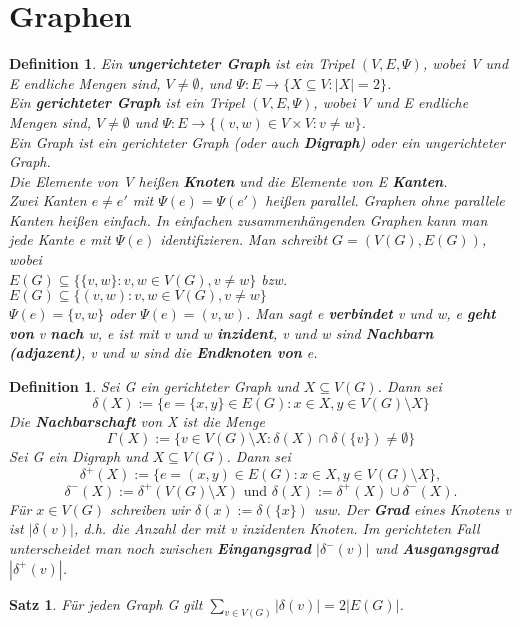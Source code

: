 \documentclass[12pt,a4paper]{article}
\theoremstyle{plain}
\newtheorem{Satz}[Theorem]{Satz}
\newtheorem{Definition}[Theorem]{Definition}
\newcommand{\herv}[1]{{\emph{\textbf{#1}}}}
\numberwithin{equation}{section}
\begin{document}
\section{Graphen}
\begin{Definition}
Ein \herv{ungerichteter Graph} ist ein Tripel $(V,E,\Psi)$, wobei V und E endliche Mengen sind, $V\neq\emptyset$, und $\Psi:E\rightarrow\{X\subseteq V:|X|=2\}$.\\
Ein \herv{gerichteter Graph} ist ein Tripel $(V,E,\Psi)$, wobei V und E endliche Mengen sind, $V\neq \emptyset$ und $\Psi: E\rightarrow\{(v,w)\in V\times V: v\neq w\}$.\\
Ein Graph ist ein gerichteter Graph (oder auch \herv{Digraph}) oder ein ungerichteter Graph. \\
Die Elemente von V heißen \herv{Knoten} und die Elemente von E \herv{Kanten}. \\
Zwei Kanten $e\neq e'$ mit $\Psi(e)=\Psi(e')$ heißen parallel. Graphen ohne parallele Kanten heißen einfach. In einfachen zusammenhängenden Graphen kann man jede Kante e mit $\Psi(e)$ identifizieren. Man schreibt $G=(V(G),E(G))$, wobei \\
$E(G)\subseteq\{\{v,w\}:v,w\in V(G), v\neq w\}$ bzw. $E(G)\subseteq\{(v,w):v,w\in V(G),v\neq w \}$\\
$\Psi(e)=\{v,w\}$ oder $\Psi(e)=(v,w)$. Man sagt e \herv{verbindet} v und w, e \herv{geht von} v \herv{nach} w, e ist mit v und w \herv{inzident}, v und w sind \herv{Nachbarn (adjazent)}, v und w sind die \herv{Endknoten von} e.
\end{Definition}
\begin{Definition}
Sei G ein gerichteter Graph und $X\subseteq V(G)$. Dann sei 
\[ \delta(X):=\{e=\{x,y\}\in E(G): x\in X, y \in V(G)\setminus X\} \]
Die \herv{Nachbarschaft} von X ist die Menge
\[ \Gamma(X):=\{v\in V(G)\setminus X: \delta(X) \cap \delta(\{v\})\neq \emptyset \} \]
Sei G ein Digraph und $X\subseteq V(G)$. Dann sei
\[ \delta^+(X):=\{e=(x,y)\in E(G): x\in X, y \in V(G)\setminus X\}, \]
\[ \delta^-(X):=\delta^+(V(G)\setminus X)\text{ und } \delta(X):=\delta^+(X)\cup \delta^-(X). \]
Für $x \in V(G)$ schreiben wir $\delta(x):=\delta(\{x\})$ usw. Der \herv{Grad} eines Knotens v ist $|\delta(v)|$, d.h. die Anzahl der mit v inzidenten Knoten. Im gerichteten Fall unterscheidet man noch zwischen \herv{Eingangsgrad} $|\delta^-(v)|$ und \herv{Ausgangsgrad} $|\delta^+(v)|$.
\end{Definition}
\begin{Satz}
Für jeden Graph G gilt $\sum_{v\in V(G)}{|\delta(v)|}=2|E(G)|$.
\end{Satz}
\end{document}
